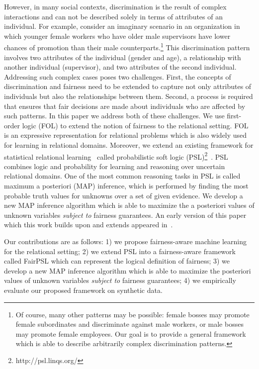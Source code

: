 \documentclass[11pt]{article}
\begin{document}
However, in many social contexts, discrimination is the result of complex interactions and can not be described solely in terms of attributes of an individual. For example, consider an imaginary scenario in an organization in which younger female workers who have older male supervisors have lower chances of promotion than their male counterparts.\footnote{Of course, many other patterns may be possible: female bosses may promote female subordinates and discriminate against male workers, or male bosses may promote female employees.  Our goal is to provide a general framework which is able to describe arbitrarily complex discrimination patterns.} 
 This discrimination pattern involves two attributes of the individual (gender and age), a relationship with another individual (supervisor), and two attributes of the second individual. Addressing such complex cases poses two challenges. First, the concepts of discrimination and fairness need to be extended to capture not only attributes of individuals but also the relationships between them. Second, a process is required that ensures that fair decisions are made about individuals who are affected by such patterns. In this paper we address both of these challenges.
We use first-order logic (FOL) to extend the notion of fairness to the relational setting. FOL is an expressive representation for relational problems which is also widely used for learning in relational domains. Moreover, we extend an existing framework for statistical relational learning~\cite{getoor2007introduction} called probabilistic soft logic (PSL)\footnote{http://psl.linqs.org/}~\cite{bach:jmlr17}. PSL combines logic and probability for learning and reasoning over uncertain relational domains. One of the most common reasoning tasks in PSL is called maximum a posteriori (MAP) inference, which is performed by finding the most probable truth values for unknowns over a set of given evidence. We develop a new MAP inference algorithm which is able to maximize the a posteriori values of unknown variables \emph{subject to} fairness guarantees. An early version of this paper which this work builds upon and extends appeared in~\cite{farnadi2018fairness}.

Our contributions are as follows: 1) we propose fairness-aware machine learning for the relational setting; 2) we extend PSL into a fairness-aware framework called FairPSL which can represent the logical definition of fairness; 3) we develop a new MAP inference algorithm which is able to maximize the posteriori values of unknown variables \emph{subject to} fairness guarantees; 4) we empirically evaluate our proposed framework on synthetic data. 
\end{document}
